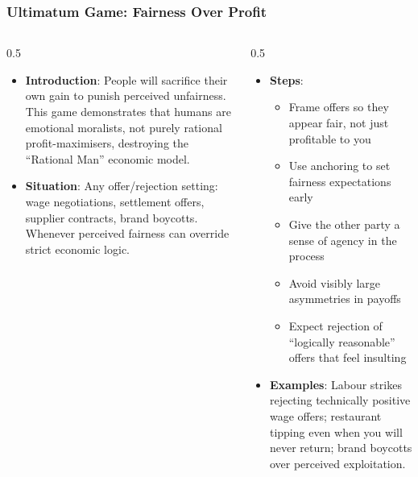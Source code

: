 \begin{frame}[fragile]\frametitle{Ultimatum Game: Fairness Over Profit}
\begin{columns}
    \begin{column}[T]{0.5\linewidth}
      \begin{itemize}
        \item \textbf{Introduction}: People will sacrifice their own gain to punish perceived unfairness. This game demonstrates that humans are emotional moralists, not purely rational profit-maximisers, destroying the ``Rational Man'' economic model.
        \item \textbf{Situation}: Any offer/rejection setting: wage negotiations, settlement offers, supplier contracts, brand boycotts. Whenever perceived fairness can override strict economic logic.
      \end{itemize}
    \end{column}
    \begin{column}[T]{0.5\linewidth}
      \begin{itemize}
        \item \textbf{Steps}:
        \begin{itemize}
          \item Frame offers so they appear fair, not just profitable to you
          \item Use anchoring to set fairness expectations early
          \item Give the other party a sense of agency in the process
          \item Avoid visibly large asymmetries in payoffs
          \item Expect rejection of ``logically reasonable'' offers that feel insulting
        \end{itemize}\item \textbf{Examples}: Labour strikes rejecting technically positive wage offers; restaurant tipping even when you will never return; brand boycotts over perceived exploitation.
      \end{itemize}
    \end{column}
  \end{columns}
\end{frame}


